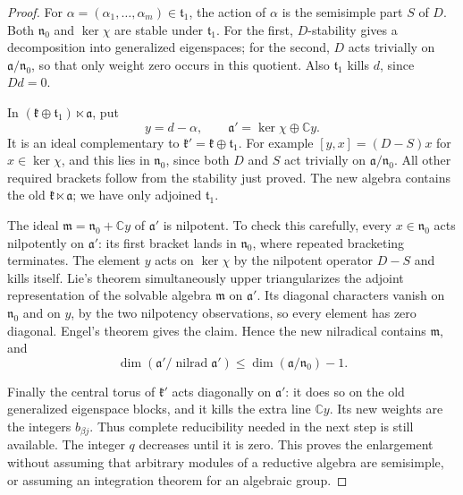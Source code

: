 \begin{proof}
For \(\alpha=(\alpha_1,\ldots,\alpha_m)\in\mathfrak t_1\),
the action of \(\alpha\) is the semisimple part \(S\) of \(D\).
Both \(\mathfrak n_0\) and \(\ker\chi\) are stable under
\(\mathfrak t_1\). For the first, \(D\)-stability gives a
decomposition into generalized eigenspaces; for the second,
\(D\) acts trivially on \(\mathfrak a/\mathfrak n_0\), so that
only weight zero occurs in this quotient.
Also \(\mathfrak t_1\) kills \(d\), since \(D d=0\).

In \((\mathfrak k\oplus\mathfrak t_1)\ltimes\mathfrak a\), put
\[
 y=d-\alpha,\qquad
 \mathfrak a'=\ker\chi\oplus\mathbb C y.
\]
It is an ideal complementary to
\(\mathfrak k'=\mathfrak k\oplus\mathfrak t_1\).
For example \([y,x]=(D-S)x\) for \(x\in\ker\chi\), and this
lies in \(\mathfrak n_0\), since both \(D\) and \(S\) act
trivially on \(\mathfrak a/\mathfrak n_0\).
All other required brackets follow from the stability just proved.
The new algebra contains the old \(\mathfrak k\ltimes\mathfrak a\);
we have only adjoined \(\mathfrak t_1\).

The ideal \(\mathfrak m=\mathfrak n_0+\mathbb C y\) of
\(\mathfrak a'\) is nilpotent. To check this carefully, every
\(x\in\mathfrak n_0\) acts nilpotently on \(\mathfrak a'\):
its first bracket lands in \(\mathfrak n_0\), where repeated
bracketing terminates. The element \(y\) acts on \(\ker\chi\)
by the nilpotent operator \(D-S\) and kills itself.
Lie's theorem simultaneously upper triangularizes the adjoint
representation of the solvable algebra \(\mathfrak m\) on
\(\mathfrak a'\). Its diagonal characters vanish on
\(\mathfrak n_0\) and on \(y\), by the two nilpotency observations,
so every element has zero diagonal. Engel's theorem gives the
claim. Hence the new nilradical contains \(\mathfrak m\), and
\[
 \dim(\mathfrak a'/\operatorname{nilrad}\mathfrak a')
 \leq \dim(\mathfrak a/\mathfrak n_0)-1.
\]

Finally the central torus of \(\mathfrak k'\) acts diagonally
on \(\mathfrak a'\): it does so on the old generalized
eigenspace blocks, and it kills the extra line \(\mathbb C y\).
Its new weights are the integers \(b_{\beta j}\).
Thus complete reducibility needed in the next step is still
available. The integer \(q\) decreases until it is zero.
This proves the enlargement without assuming that arbitrary
modules of a reductive algebra are semisimple, or assuming an
integration theorem for an algebraic group.
\end{proof}

